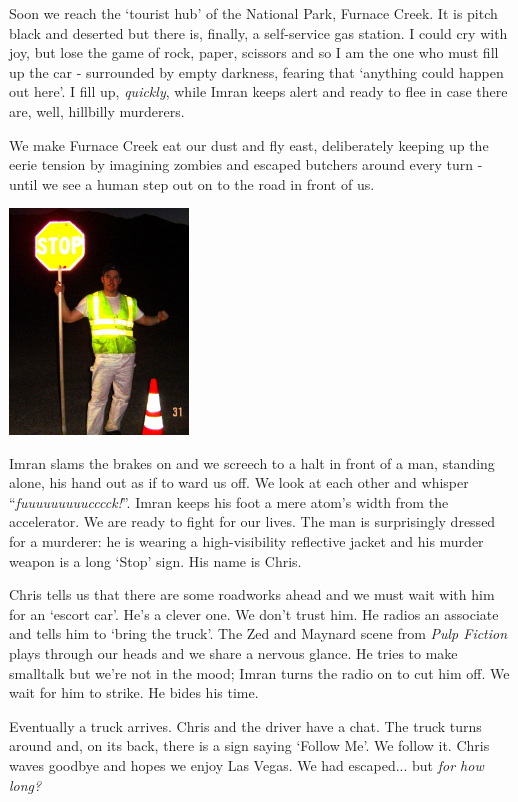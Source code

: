 \documentclass[a5paper,titlepage,11pt]{book}
\begin{document}
Soon we reach the `tourist hub' of the National Park, Furnace Creek. It is pitch black and deserted but there is, finally, a self-service gas station.  I could cry with joy, but lose the game of rock, paper, scissors and so I am the one who must fill up the car - surrounded by empty darkness, fearing that `anything could happen out here'. I fill up, \emph{quickly}, while Imran keeps alert and ready to flee in case there are, well, hillbilly murderers.

We make Furnace Creek eat our dust and fly east, deliberately keeping up the eerie tension by imagining zombies and escaped butchers around every turn - until we see a human step out on to the road in front of us.

\begin{center}\includegraphics[height=60mm]{gfx/DSC00683}\end{center}

Imran slams the brakes on and we screech to a halt in front of a man, standing alone, his hand out as if to ward us off. We look at each other and whisper ``\emph{fuuuuuuuuucccck!}''. Imran keeps his foot a mere atom's width from the accelerator. We are ready to fight for our lives. The man is surprisingly dressed for a murderer: he is wearing a high-visibility reflective jacket and his murder weapon is a long `Stop' sign. His name is Chris.

Chris tells us that there are some roadworks ahead and we must wait with him for an `escort car'. He's a clever one. We don't trust him. He radios an associate and tells him to `bring the truck'. The Zed and Maynard scene from \emph{Pulp Fiction} plays through our heads and we share a nervous glance. He tries to make smalltalk but we're not in the mood; Imran turns the radio on to cut him off. We wait for him to strike. He bides his time.

Eventually a truck arrives. Chris and the driver have a chat. The truck turns around and, on its back, there is a sign saying `Follow Me'. We follow it. Chris waves goodbye and hopes we enjoy Las Vegas. We had escaped... but \emph{for how long?}
\end{document}
